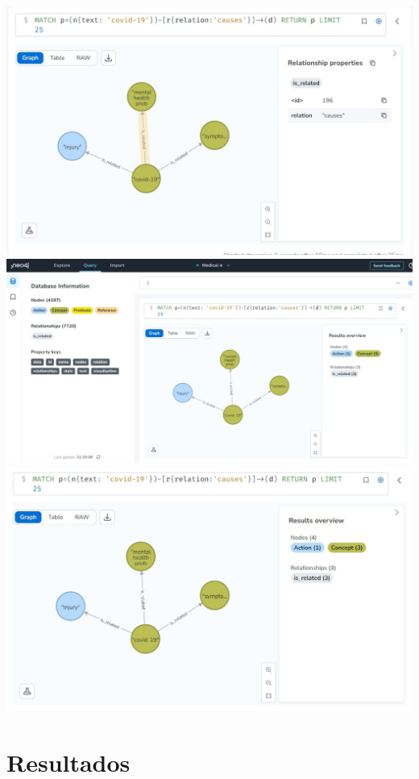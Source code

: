 \documentclass[10pt]{article} %
\begin{document}
	\begin{center}
		\includegraphics[scale=0.5]{../images/imagecons}
		\includegraphics[scale=0.5]{../images/imagecons1}
		\includegraphics[scale=0.5]{../images/imageconsulta}
	\end{center}

	\section{Resultados}
	
\end{document}
